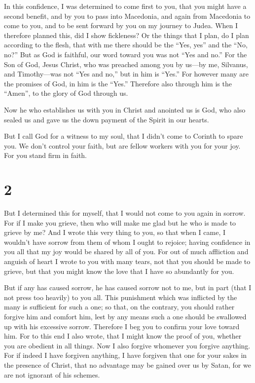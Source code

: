  In this confidence, I was determined to come first to
you, that you might have a second benefit,  and by you to
pass into Macedonia, and again from Macedonia to come to you, and to be
sent forward by you on my journey to Judea.  When I
therefore planned this, did I show fickleness? Or the things that I
plan, do I plan according to the flesh, that with me there should be the
``Yes, yes'' and the ``No, no?''  But as God is faithful,
our word toward you was not ``Yes and no.''  For the Son
of God, Jesus Christ, who was preached among you by us---by me,
Silvanus, and Timothy---was not ``Yes and no,'' but in him is ``Yes.''
 For however many are the promises of God, in him is the
``Yes.'' Therefore also through him is the ``Amen'', to the glory of God
through us.

 Now he who establishes us with you in Christ and
anointed us is God,  who also sealed us and gave us the
down payment of the Spirit in our hearts.

 But I call God for a witness to my soul, that I didn't
come to Corinth to spare you.  We don't control your
faith, but are fellow workers with you for your joy. For you stand firm
in faith.

\hypertarget{section-1}{%
\section{2}\label{section-1}}

 But I determined this for myself, that I would not come
to you again in sorrow.  For if I make you grieve, then
who will make me glad but he who is made to grieve by me? 
And I wrote this very thing to you, so that when I came, I wouldn't have
sorrow from them of whom I ought to rejoice; having confidence in you
all that my joy would be shared by all of you.  For out of
much affliction and anguish of heart I wrote to you with many tears, not
that you should be made to grieve, but that you might know the love that
I have so abundantly for you.

 But if any has caused sorrow, he has caused sorrow not to
me, but in part (that I not press too heavily) to you all.
 This punishment which was inflicted by the many is
sufficient for such a one;  so that, on the contrary, you
should rather forgive him and comfort him, lest by any means such a one
should be swallowed up with his excessive sorrow. 
Therefore I beg you to confirm your love toward him.  For
to this end I also wrote, that I might know the proof of you, whether
you are obedient in all things.  Now I also forgive
whomever you forgive anything. For if indeed I have forgiven anything, I
have forgiven that one for your sakes in the presence of Christ,
 that no advantage may be gained over us by Satan, for we
are not ignorant of his schemes.

